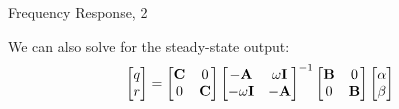 \documentclass{beamer}
\begin{document}
\begin{frame}{Frequency Response, 2}
\begin{flushleft}
		We can also solve for the steady-state output:
		\begin{align}
			\begin{bmatrix}
				q \\  r
			\end{bmatrix}
			= 
			\begin{bmatrix}
				\mathbf{C} & 0 \\  0 & \mathbf{C}
			\end{bmatrix}
			\begin{bmatrix}
				-\mathbf{A} & \omega \mathbf{I} \\
				-\omega \mathbf{I} & -\mathbf{A}
			\end{bmatrix}^{-1}
			\begin{bmatrix}
				\mathbf{B} & 0 \\  0 & \mathbf{B}
			\end{bmatrix}
			\begin{bmatrix}
				\alpha \\   \beta
			\end{bmatrix}
		\end{align}		
		
		
	\end{flushleft}
\end{frame}
\end{document}
